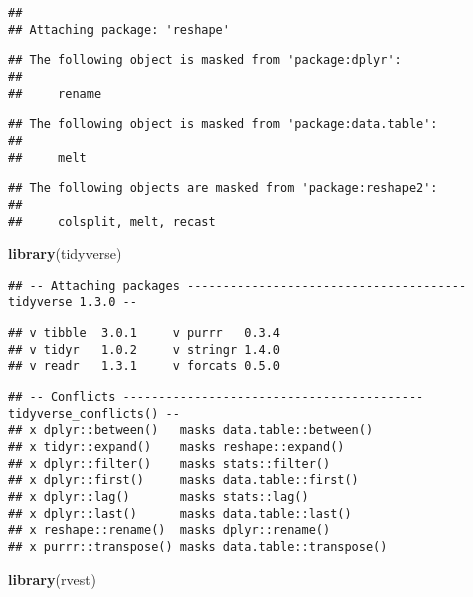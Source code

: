 \documentclass[]{article}
\newenvironment{Shaded}{\begin{snugshade}}{\end{snugshade}}
\newcommand{\KeywordTok}[1]{\textcolor[rgb]{0.13,0.29,0.53}{\textbf{#1}}}
\newcommand{\NormalTok}[1]{#1}
\begin{document}
\begin{verbatim}
## 
## Attaching package: 'reshape'
\end{verbatim}

\begin{verbatim}
## The following object is masked from 'package:dplyr':
## 
##     rename
\end{verbatim}

\begin{verbatim}
## The following object is masked from 'package:data.table':
## 
##     melt
\end{verbatim}

\begin{verbatim}
## The following objects are masked from 'package:reshape2':
## 
##     colsplit, melt, recast
\end{verbatim}

\begin{Shaded}
\begin{Highlighting}[]
\KeywordTok{library}\NormalTok{(tidyverse)}
\end{Highlighting}
\end{Shaded}

\begin{verbatim}
## -- Attaching packages --------------------------------------- tidyverse 1.3.0 --
\end{verbatim}

\begin{verbatim}
## v tibble  3.0.1     v purrr   0.3.4
## v tidyr   1.0.2     v stringr 1.4.0
## v readr   1.3.1     v forcats 0.5.0
\end{verbatim}

\begin{verbatim}
## -- Conflicts ------------------------------------------ tidyverse_conflicts() --
## x dplyr::between()   masks data.table::between()
## x tidyr::expand()    masks reshape::expand()
## x dplyr::filter()    masks stats::filter()
## x dplyr::first()     masks data.table::first()
## x dplyr::lag()       masks stats::lag()
## x dplyr::last()      masks data.table::last()
## x reshape::rename()  masks dplyr::rename()
## x purrr::transpose() masks data.table::transpose()
\end{verbatim}

\begin{Shaded}
\begin{Highlighting}[]
\KeywordTok{library}\NormalTok{(rvest)}
\end{Highlighting}
\end{Shaded}
\end{document}
